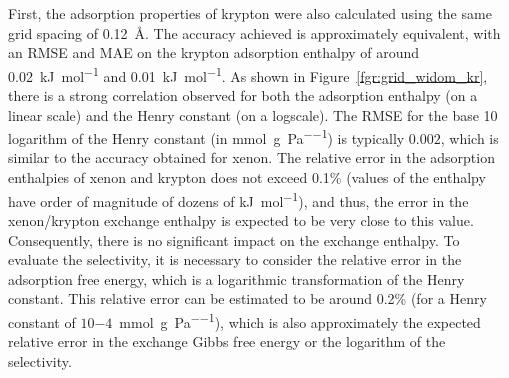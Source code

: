 \documentclass[main]{subfiles}
\begin{document}
First, the adsorption properties of krypton were also calculated using the same grid spacing of \SI{0.12}{\angstrom}. The accuracy achieved is approximately equivalent, with an RMSE and MAE on the krypton adsorption enthalpy of around \SI{0.02}{\kilo\joule\per\mole} and \SI{0.01}{\kilo\joule\per\mole}. As shown in Figure~\ref{fgr:grid_widom_kr}, there is a strong correlation observed for both the adsorption enthalpy (on a linear scale) and the Henry constant (on a logscale). The RMSE for the base 10 logarithm of the Henry constant (in \si{\milli\mole\per\gram\per\pascal}) is typically $0.002$, which is similar to the accuracy obtained for xenon. The relative error in the adsorption enthalpies of xenon and krypton does not exceed {0.1\%} (values of the enthalpy have order of magnitude of dozens of \si{\kilo\joule\per\mole}), and thus, the error  in the xenon/krypton exchange enthalpy is expected to be very close to this value. Consequently, there is no significant impact on the exchange enthalpy. To evaluate the selectivity, it is necessary to consider the relative error in the adsorption free energy, which is a logarithmic transformation of the Henry constant. This relative error can be estimated to be around {0.2\%} (for a Henry constant of $10{-4}$~\si{\milli\mole\per\gram\per\pascal}), which is also approximately the expected relative error in the exchange Gibbs free energy or the logarithm of the selectivity.
\end{document}
